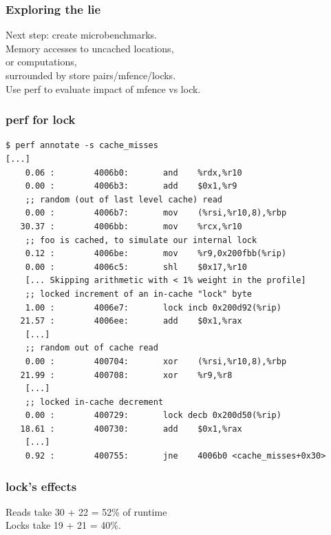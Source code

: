\begin{frame}
  \frametitle{Exploring the lie}

  
    Next step: create microbenchmarks.\\[1em]
    Memory accesses to uncached locations,\\
    or computations,\\[1em]
    surrounded by store pairs/mfence/locks.\\[1em]
    Use perf to evaluate impact of mfence vs lock.
  

\end{frame}

\begin{frame}[fragile]
  \frametitle{perf for lock}

    \begin{lstlisting}
$ perf annotate -s cache_misses
[...]
    0.06 :        4006b0:       and    %rdx,%r10
    0.00 :        4006b3:       add    $0x1,%r9
    ;; random (out of last level cache) read
    0.00 :        4006b7:       mov    (%rsi,%r10,8),%rbp
   30.37 :        4006bb:       mov    %rcx,%r10
    ;; foo is cached, to simulate our internal lock
    0.12 :        4006be:       mov    %r9,0x200fbb(%rip)
    0.00 :        4006c5:       shl    $0x17,%r10
    [... Skipping arithmetic with < 1% weight in the profile]
    ;; locked increment of an in-cache "lock" byte
    1.00 :        4006e7:       lock incb 0x200d92(%rip)
   21.57 :        4006ee:       add    $0x1,%rax
    [...]
    ;; random out of cache read
    0.00 :        400704:       xor    (%rsi,%r10,8),%rbp
   21.99 :        400708:       xor    %r9,%r8
    [...]
    ;; locked in-cache decrement
    0.00 :        400729:       lock decb 0x200d50(%rip)
   18.61 :        400730:       add    $0x1,%rax
    [...]
    0.92 :        400755:       jne    4006b0 <cache_misses+0x30>
    \end{lstlisting}


\end{frame}

\begin{frame}
  \frametitle{lock's effects}

  
    Reads take 30 + 22 = 52\% of runtime\\
    Locks take 19 + 21 = 40\%.
  

\end{frame}

